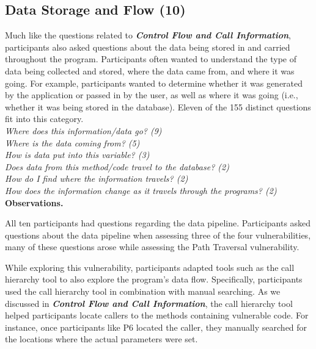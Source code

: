 \documentclass[conference]{IEEEtran}
\begin{document}

\noindent\subsection{\textbf{Data Storage and Flow (10)}}\label{dsf}
Much like the questions related to \emph{\textbf{Control Flow and Call Information}}, participants also asked questions about the data being stored in and carried throughout the program. 
Participants often wanted to understand the type of data being collected and stored, where the data came from, and where it was going. 
For example, participants wanted to determine whether it was generated by the application or passed in by the user, as well as where it was going (i.e., whether it was being stored in the database).
Eleven of the 155 distinct questions fit into this category.
\\

\noindent\emph{Where does this information/data go? (9)} \\
\emph{Where is the data coming from? (5)} \\
\emph{How is data put into this variable? (3)} \\
\emph{Does data from this method/code travel to the database? (2)} \\
\emph{How do I find where the information travels? (2)} \\
\emph{How does the information change as it travels through the programs? (2)} \\


\noindent\textbf{Observations.}

All ten participants had questions regarding the data pipeline.
Participants asked questions about the data pipeline when assessing three of the four vulnerabilities, many of these questions arose while assessing the Path Traversal vulnerability. 

While exploring this vulnerability, participants adapted tools such as the call hierarchy tool to also explore the program's data flow. 
Specifically, participants used the call hierarchy tool in combination with manual searching. 
As we discussed in \emph{\textbf{Control Flow and Call Information}}, the call hierarchy tool helped participants locate callers to the methods containing vulnerable code.
For instance, once participants like P6 located the caller, they manually searched for the locations where the actual parameters were set.
\\
\end{document}
